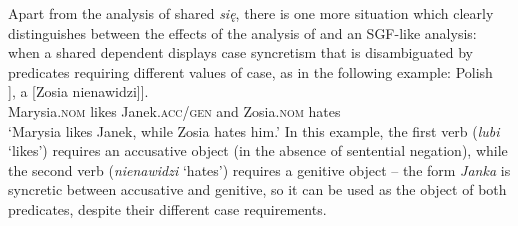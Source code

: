 \documentclass[output=paper]{../langscibook}
\begin{document}
Apart from the analysis of shared \emph{się}, there is one more
situation which clearly distinguishes between the effects of the
analysis of \citet{PatejukPrzepiorkowski2015} and an SGF-like analysis: when a
shared dependent displays case syncretism that is disambiguated by
predicates requiring different values of case, as in the following
example:
\ea\label{ex:coord:intertw:CASE:accgen}
    Polish\\\gll
      [[Marysia lubi Janka]], a [Zosia nienawidzi]]. \\
      \phtm{[[}Marysia.\textsc{nom} likes Janek.\textsc{acc/gen} and
      \phtm{[}Zosia.\textsc{nom} hates\\
\glt`Marysia likes Janek, while Zosia hates him.'
\z
In this example, the first verb (\emph{lubi} `likes') requires an accusative
object (in the absence of sentential negation), while the second verb
(\emph{nienawidzi} `hates') requires a genitive object – the form \emph{Janka}
is syncretic between accusative and genitive, so it can be used as the
object of both predicates, despite their different case
requirements.
\end{document}
